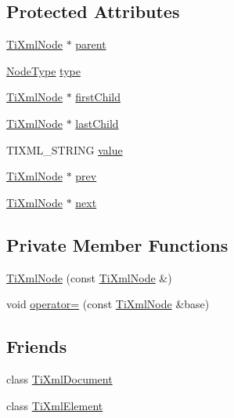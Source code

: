 \subsection*{Protected Attributes}
\begin{DoxyCompactItemize}
\item 
\hyperlink{class_ti_xml_node}{TiXmlNode} $\ast$ \hyperlink{class_ti_xml_node_a662c4de61244e4fa5bd4e2d8c63143a5}{parent}
\item 
\hyperlink{class_ti_xml_node_a836eded4920ab9e9ef28496f48cd95a2}{NodeType} \hyperlink{class_ti_xml_node_a2619c6379181c16ba95ae6922e2ca839}{type}
\item 
\hyperlink{class_ti_xml_node}{TiXmlNode} $\ast$ \hyperlink{class_ti_xml_node_af749fb7f22010b80e8f904c32653d50e}{firstChild}
\item 
\hyperlink{class_ti_xml_node}{TiXmlNode} $\ast$ \hyperlink{class_ti_xml_node_a5b30756d21b304580d22a841ec9d61f8}{lastChild}
\item 
TIXML\_\-STRING \hyperlink{class_ti_xml_node_aead528b3cedc33c16a6c539872c7cc8b}{value}
\item 
\hyperlink{class_ti_xml_node}{TiXmlNode} $\ast$ \hyperlink{class_ti_xml_node_a9c5370ea2cbfd9f0e0f7b30a57fd68f5}{prev}
\item 
\hyperlink{class_ti_xml_node}{TiXmlNode} $\ast$ \hyperlink{class_ti_xml_node_a2f329cc993d2d34df76e17dcbb776b45}{next}
\end{DoxyCompactItemize}
\subsection*{Private Member Functions}
\begin{DoxyCompactItemize}
\item 
\hyperlink{class_ti_xml_node_a5ca3233e05032d121b13fac8273de68d}{TiXmlNode} (const \hyperlink{class_ti_xml_node}{TiXmlNode} \&)
\item 
void \hyperlink{class_ti_xml_node_a9eb62a8d95b8a98ec2df481cc9e5a7e2}{operator=} (const \hyperlink{class_ti_xml_node}{TiXmlNode} \&base)
\end{DoxyCompactItemize}
\subsection*{Friends}
\begin{DoxyCompactItemize}
\item 
class \hyperlink{class_ti_xml_node_a173617f6dfe902cf484ce5552b950475}{TiXmlDocument}
\item 
class \hyperlink{class_ti_xml_node_ab6592e32cb9132be517cc12a70564c4b}{TiXmlElement}
\end{DoxyCompactItemize}


